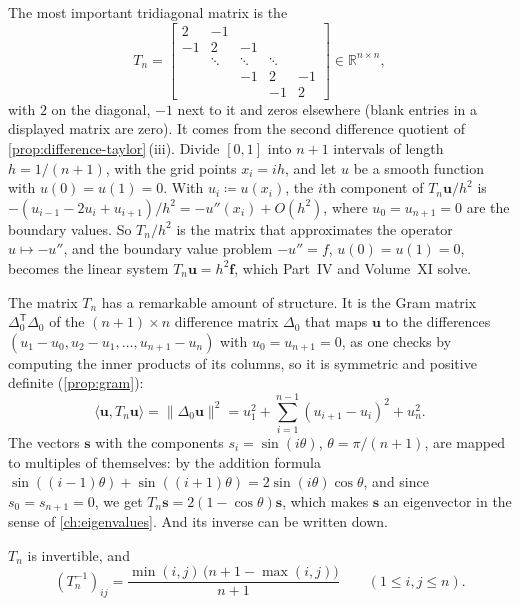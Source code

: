 The most important tridiagonal matrix is the 
\[
T_n=\begin{bmatrix}2&-1&&&\\-1&2&-1&&\\&\ddots&\ddots&\ddots&\\&&-1&2&-1\\&&&-1&2\end{bmatrix}\in\mathbb R^{n\times n},
\]
with $2$ on the diagonal, $-1$ next to it and zeros elsewhere (blank entries in a displayed matrix are zero). It comes from the second difference quotient of \cref{prop:difference-taylor}\,(iii). Divide $[0,1]$ into $n+1$ intervals of length $h=1/(n+1)$, with the grid points $x_i=ih$, and let $u$ be a smooth function with $u(0)=u(1)=0$. With $u_i\coloneqq u(x_i)$, the $i$th component of $T_n\mathbf u/h^2$ is $-(u_{i-1}-2u_i+u_{i+1})/h^2=-u''(x_i)+O(h^2)$, where $u_0=u_{n+1}=0$ are the boundary values. So $T_n/h^2$ is the matrix that approximates the operator $u\mapsto-u''$, and the boundary value problem $-u''=f$, $u(0)=u(1)=0$, becomes the linear system $T_n\mathbf u=h^2\mathbf f$, which Part~IV and Volume~XI solve.

The matrix $T_n$ has a remarkable amount of structure. It is the Gram matrix $\Delta_0^{\mathsf T}\Delta_0$ of the $(n+1)\times n$ difference matrix $\Delta_0$ that maps $\mathbf u$ to the differences $(u_1-u_0,u_2-u_1,\ldots,u_{n+1}-u_n)$ with $u_0=u_{n+1}=0$, as one checks by computing the inner products of its columns, so it is symmetric and positive definite (\cref{prop:gram}):
\[
\langle\mathbf u,T_n\mathbf u\rangle=\|\Delta_0\mathbf u\|^2=u_1^2+\sum_{i=1}^{n-1}(u_{i+1}-u_i)^2+u_n^2 .
\]
The vectors $\mathbf s$ with the components $s_i=\sin(i\theta)$, $\theta=\pi/(n+1)$, are mapped to multiples of themselves: by the addition formula $\sin((i-1)\theta)+\sin((i+1)\theta)=2\sin(i\theta)\cos\theta$, and since $s_0=s_{n+1}=0$, we get $T_n\mathbf s=2(1-\cos\theta)\mathbf s$, which makes $\mathbf s$ an eigenvector in the sense of \cref{ch:eigenvalues}. And its inverse can be written down.

\begin{proposition}
\label{prop:second-difference-inverse}
$T_n$ is invertible, and
\[
(T_n^{-1})_{ij}=\frac{\min(i,j)\,\bigl(n+1-\max(i,j)\bigr)}{n+1}\qquad(1\le i,j\le n).
\]
\end{proposition}

